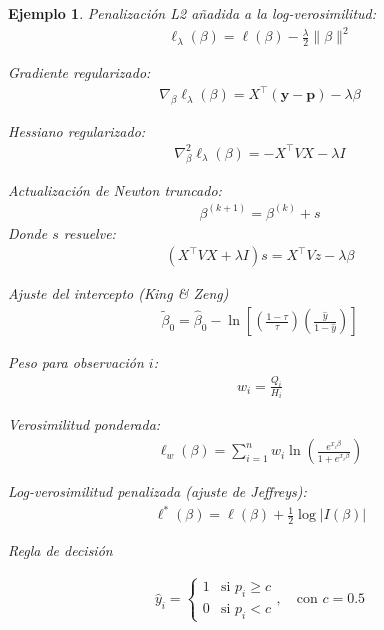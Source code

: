 \documentclass[12pt]{article}
\newtheorem{Ejem}{Ejemplo}%
\begin{document}
\begin{Ejem}
Penalización L2 añadida a la log-verosimilitud:
\begin{eqnarray*}
    \ell_\lambda(\beta) = \ell(\beta) - \frac{\lambda}{2} \|\beta\|^2
\end{eqnarray*}

Gradiente regularizado:
\begin{eqnarray*}
    \nabla_\beta \ell_\lambda(\beta) = X^\top (\mathbf{y} - \mathbf{p}) - \lambda \beta
\end{eqnarray*}

Hessiano regularizado:
\begin{eqnarray*}
    \nabla^2_\beta \ell_\lambda(\beta) = - X^\top V X - \lambda I
\end{eqnarray*}

Actualización de Newton truncado:
\begin{eqnarray*}
    \beta^{(k+1)} = \beta^{(k)} + s
\end{eqnarray*}
Donde $s$ resuelve:
\begin{eqnarray*}
    (X^\top V X + \lambda I) s = X^\top V z - \lambda \beta
\end{eqnarray*}

Ajuste del intercepto (King \& Zeng)
\begin{eqnarray*}
    \tilde{\beta}_0 = \hat{\beta}_0 - \ln \left[ \left( \frac{1 - \tau}{\tau} \right) \left( \frac{\hat{y}}{1 - \hat{y}} \right) \right]
\end{eqnarray*}

Peso para observación $i$:
\begin{eqnarray*}
    w_i = \frac{Q_i}{H_i}
\end{eqnarray*}

Verosimilitud ponderada:
\begin{eqnarray*}
    \ell_w(\beta) = \sum_{i=1}^n w_i \ln \left( \frac{e^{x_i \beta}}{1 + e^{x_i \beta}} \right)
\end{eqnarray*}


Log-verosimilitud penalizada (ajuste de Jeffreys):
\begin{eqnarray*}
    \ell^*(\beta) = \ell(\beta) + \frac{1}{2} \log |I(\beta)|
\end{eqnarray*}

Regla de decisión

\begin{eqnarray*}
    \hat{y}_i =
    \begin{cases}
        1 & \text{si } p_i \geq c \\
        0 & \text{si } p_i < c
    \end{cases}, \quad \text{con } c = 0.5
\end{eqnarray*}
\end{Ejem}
\end{document}
